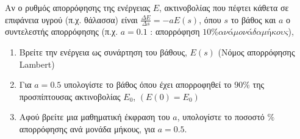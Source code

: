 


\pagestyle{askhseis}





\begin{center}
\end{center}

\vspace{\baselineskip}

\begin{exercise}
  Αν ο ρυθμός απορρόφησης της ενέργειας $E$, ακτινοβολίας που πέφτει κάθετα σε 
  επιφάνεια υγρού (π.χ. θάλασσα) είναι $ \frac{\Delta E}{\Delta s} = -a E(s) $, 
  όπου $s$ το βάθος και $a$ ο συντελεστής απορρόφησης (π.χ. $ a=0.1 $ : απορρόφηση 
  $ 10\% ανά μονάδα μήκους $), 
  \begin{enumerate}
    \item Βρείτε την ενέργεια ως συνάρτηση του βάθους, $ E(s) $ (Νόμος απορρόφησης
      Lambert)
    \item Για $ a=0.5 $ υπολογίστε το βάθος όπου έχει απορροφηθεί το $ 90\% $ της 
      προσπίπτουσας ακτινοβολίας $ E_{0} $, $(E(0)=E_{0}) $
    \item Αφού βρείτε μια μαθηματική έκφραση του $a$, υπολογίστε το ποσοστό $ \% $
      απορρόφησης ανά μονάδα μήκους, για $ a=0.5 $.
  \end{enumerate}
\end{exercise}
